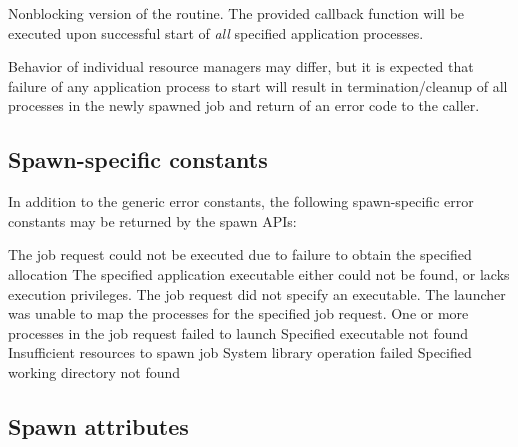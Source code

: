 \optattrend

\descr

Nonblocking version of the  routine. The provided callback function will be executed upon successful start of \textit{all} specified application processes.

\adviceuserstart
Behavior of individual resource managers may differ, but it is expected that failure of any application process to start will result in termination/cleanup of all processes in the newly spawned job and return of an error code to the caller.
\adviceuserend

\subsection{Spawn-specific constants}
\label{api:struct:constants:spawn}

In addition to the generic error constants, the following spawn-specific error constants may be returned by the spawn \acp{API}:

\begin{constantdesc}
%
The job request could not be executed due to failure to obtain the specified allocation
%
The specified application executable either could not be found, or lacks execution privileges.
%
The job request did not specify an executable.
%
The launcher was unable to map the processes for the specified job request.
%
One or more processes in the job request failed to launch
%
Specified executable not found
%
Insufficient resources to spawn job
%
System library operation failed
%
Specified working directory not found
%
\end{constantdesc}

\subsection{Spawn attributes}
\label{api:struct:attributes:spawn}

